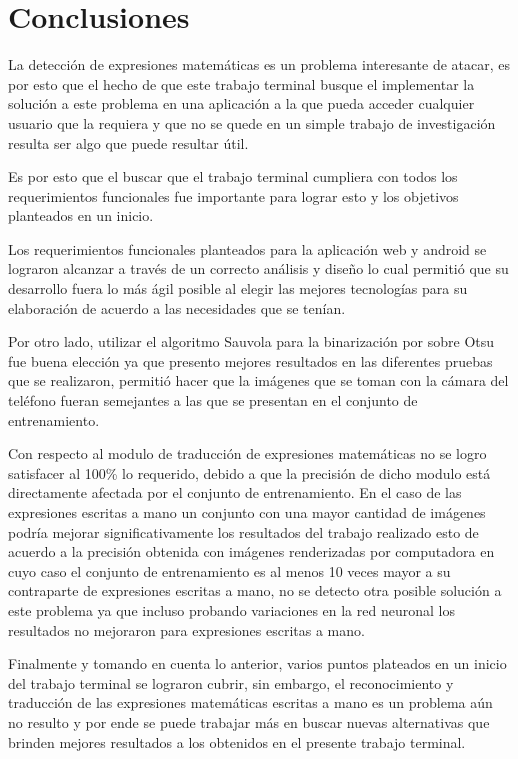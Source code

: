 \chapter{Conclusiones}
La detección de expresiones matemáticas es un problema interesante de atacar, es por esto que el hecho de que este trabajo terminal busque el implementar la solución a este problema en una aplicación a la que pueda acceder cualquier usuario que la requiera y que no se quede en un simple trabajo de investigación resulta ser algo que puede resultar útil.

Es por esto que el buscar que el trabajo terminal cumpliera con todos los requerimientos funcionales fue importante para lograr esto y los objetivos planteados en un inicio.

Los requerimientos funcionales planteados para la aplicación web y  android se lograron alcanzar a través de un correcto análisis y diseño lo cual permitió que su desarrollo fuera lo más ágil posible al elegir las mejores tecnologías para su elaboración de acuerdo a las necesidades que se tenían.

Por otro lado, utilizar el algoritmo Sauvola para la binarización por sobre Otsu fue buena elección ya que presento mejores resultados en las diferentes pruebas que se realizaron, permitió hacer que la imágenes que se toman con la cámara del teléfono fueran semejantes a las que se presentan en el conjunto de entrenamiento.

Con respecto al modulo de traducción de expresiones matemáticas no se logro satisfacer al 100\% lo requerido, debido a que la precisión de dicho modulo está directamente afectada por el conjunto de entrenamiento. En el caso de las expresiones escritas a mano un conjunto con una mayor cantidad de imágenes podría mejorar significativamente los resultados del trabajo realizado esto de acuerdo a la precisión obtenida con imágenes renderizadas por computadora en cuyo caso el conjunto de entrenamiento es al menos 10 veces mayor a su contraparte de expresiones escritas a mano, no se detecto otra posible solución a este problema ya que incluso probando variaciones en la red neuronal los resultados no mejoraron para expresiones escritas a mano.

Finalmente y tomando en cuenta lo anterior, varios puntos plateados en un inicio del trabajo terminal se lograron cubrir, sin embargo, el reconocimiento y traducción de las expresiones matemáticas escritas a mano es un problema aún no resulto y por ende se puede trabajar más en buscar nuevas alternativas que brinden mejores resultados a los obtenidos en el presente trabajo terminal.


